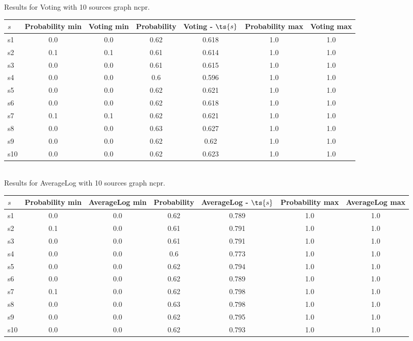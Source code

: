 \documentclass{article}
\begin{document}
\noindent Results for Voting with 10 sources graph ncpr.

\noindent\begin{tabular}{|l|c|c|c|c|c|c|}
\hline
$s$& Probability min & Voting min & Probability & Voting - $\ts{s}$ & Probability max & Voting max\\
\hline
s1 &0.0 & 0.0 & 0.62 & 0.618 & 1.0 & 1.0\\
\hline
s2 &0.1 & 0.1 & 0.61 & 0.614 & 1.0 & 1.0\\
\hline
s3 &0.0 & 0.0 & 0.61 & 0.615 & 1.0 & 1.0\\
\hline
s4 &0.0 & 0.0 & 0.6 & 0.596 & 1.0 & 1.0\\
\hline
s5 &0.0 & 0.0 & 0.62 & 0.621 & 1.0 & 1.0\\
\hline
s6 &0.0 & 0.0 & 0.62 & 0.618 & 1.0 & 1.0\\
\hline
s7 &0.1 & 0.1 & 0.62 & 0.621 & 1.0 & 1.0\\
\hline
s8 &0.0 & 0.0 & 0.63 & 0.627 & 1.0 & 1.0\\
\hline
s9 &0.0 & 0.0 & 0.62 & 0.62 & 1.0 & 1.0\\
\hline
s10 &0.0 & 0.0 & 0.62 & 0.623 & 1.0 & 1.0\\
\hline
\end{tabular}\\

\noindent Results for AverageLog with 10 sources graph ncpr.

\noindent\begin{tabular}{|l|c|c|c|c|c|c|}
\hline
$s$& Probability min & AverageLog min & Probability & AverageLog - $\ts{s}$ & Probability max & AverageLog max\\
\hline
s1 &0.0 & 0.0 & 0.62 & 0.789 & 1.0 & 1.0\\
\hline
s2 &0.1 & 0.0 & 0.61 & 0.791 & 1.0 & 1.0\\
\hline
s3 &0.0 & 0.0 & 0.61 & 0.791 & 1.0 & 1.0\\
\hline
s4 &0.0 & 0.0 & 0.6 & 0.773 & 1.0 & 1.0\\
\hline
s5 &0.0 & 0.0 & 0.62 & 0.794 & 1.0 & 1.0\\
\hline
s6 &0.0 & 0.0 & 0.62 & 0.789 & 1.0 & 1.0\\
\hline
s7 &0.1 & 0.0 & 0.62 & 0.798 & 1.0 & 1.0\\
\hline
s8 &0.0 & 0.0 & 0.63 & 0.798 & 1.0 & 1.0\\
\hline
s9 &0.0 & 0.0 & 0.62 & 0.795 & 1.0 & 1.0\\
\hline
s10 &0.0 & 0.0 & 0.62 & 0.793 & 1.0 & 1.0\\
\hline
\end{tabular}\\
\end{document}
